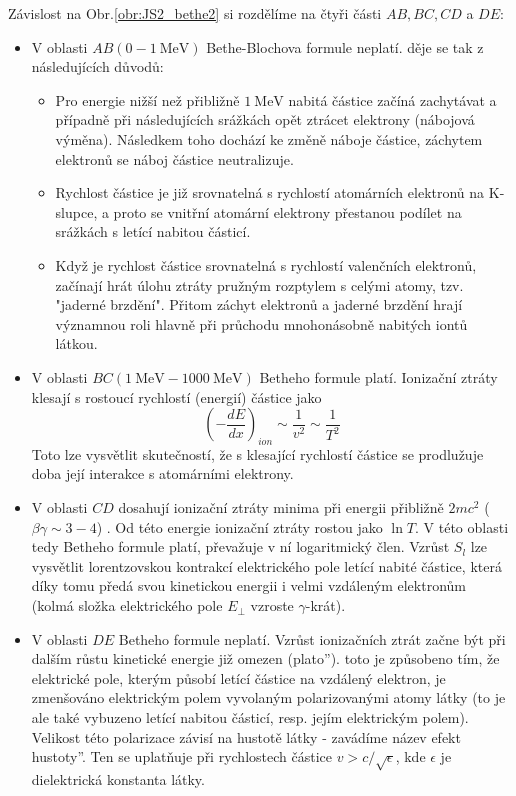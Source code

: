 \documentclass[../../main.tex]{subfiles}
\begin{document}
Závislost na Obr.\ref{obr:JS2_bethe2} si rozdělíme na čtyři části $AB, BC, CD $ a $DE$:
\begin{itemize}
	\item V oblasti $AB (0 - 1 ~\mathrm{MeV})$ Bethe-Blochova formule neplatí. děje se tak z následujících důvodů:
	\begin{itemize}
		\item Pro energie nižší než přibližně $1 ~\mathrm{MeV}$ nabitá částice začíná zachytávat a případně při následujících srážkách opět ztrácet elektrony (nábojová výměna). Následkem toho dochází ke změně náboje částice, záchytem elektronů se náboj částice neutralizuje.
		\item Rychlost částice je již srovnatelná s rychlostí atomárních elektronů na K-slupce, a proto se vnitřní atomární elektrony přestanou podílet na srážkách s letící nabitou částicí.
		\item Když je rychlost částice srovnatelná s rychlostí valenčních elektronů, začínají hrát úlohu ztráty pružným rozptylem s celými atomy, tzv. "jaderné brzdění". Přitom záchyt elektronů a jaderné brzdění hrají významnou roli hlavně při průchodu mnohonásobně nabitých iontů látkou.
	\end{itemize}
     \item V oblasti $BC (1 ~\mathrm{MeV} - 1000 ~\mathrm{MeV})$ Betheho formule platí. Ionizační ztráty klesají s rostoucí rychlostí (energií) částice jako
     \begin{equation}
     \left( - \dfrac{dE}{dx}\right)_{ion} \sim \dfrac{1}{v^2} \sim \dfrac{1}{T^2}
     \end{equation}
	Toto lze vysvětlit skutečností, že s klesající rychlostí částice se prodlužuje doba její interakce s atomárními elektrony.
	\item V oblasti $CD$ dosahují ionizační ztráty minima při energii přibližně $2mc^2$ ($\beta \gamma \sim 3- 4$) . Od této energie ionizační ztráty rostou jako $\ln T$. V této oblasti tedy Betheho formule platí, převažuje v ní logaritmický člen. Vzrůst $S_l$ lze vysvětlit lorentzovskou kontrakcí elektrického pole letící nabité částice, která díky tomu předá svou kinetickou energii i velmi vzdáleným elektronům (kolmá složka elektrického pole $E_\perp$ vzroste $\gamma$-krát).
	\item V oblasti $DE$ Betheho formule neplatí. Vzrůst ionizačních ztrát začne být při dalším růstu kinetické energie již omezen (\quotedblbase plato\textquotedblright). toto je způsobeno tím, že elektrické pole, kterým působí letící částice na vzdálený elektron, je zmenšováno elektrickým polem vyvolaným polarizovanými atomy látky (to je ale také vybuzeno letící nabitou částicí, resp. jejím elektrickým polem). Velikost této polarizace závisí na hustotě látky - zavádíme název \quotedblbase efekt hustoty\textquotedblright. Ten se uplatňuje při rychlostech částice $v > c/\sqrt{\epsilon}$, kde $\epsilon$ je dielektrická konstanta látky.
\end{itemize}	
\end{document}
